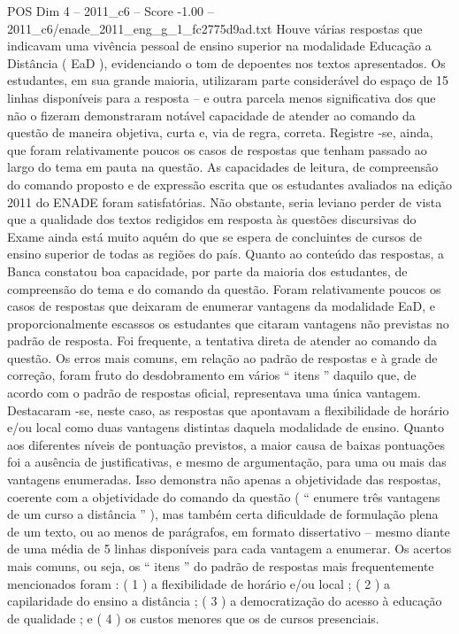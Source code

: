 \begin{textsample}{POS Dim 4 – 2011\_c6 – Score -1.00 – 2011\_c6/enade\_2011\_eng\_g\_1\_fc2775d9ad.txt}
Houve várias respostas que indicavam uma vivência pessoal de ensino superior na modalidade Educação a Distância ( EaD ), evidenciando o tom de depoentes nos textos apresentados.
Os estudantes, em sua grande maioria, utilizaram parte considerável do espaço de 15 linhas disponíveis para a resposta – e outra parcela menos significativa dos que não o fizeram demonstraram notável capacidade de atender ao comando da questão de maneira objetiva, curta e, via de regra, correta.
Registre -se, ainda, que foram relativamente poucos os casos de respostas que tenham passado ao largo do tema em pauta na questão.
As capacidades de leitura, de compreensão do comando proposto e de expressão escrita que os estudantes avaliados na edição 2011 do ENADE foram satisfatórias.
Não obstante, seria leviano perder de vista que a qualidade dos textos redigidos em resposta às questões discursivas do Exame ainda está muito aquém do que se espera de concluintes de cursos de ensino superior de todas as regiões do país.
Quanto ao conteúdo das respostas, a Banca constatou boa capacidade, por parte da maioria dos estudantes, de compreensão do tema e do comando da questão.
Foram relativamente poucos os casos de respostas que deixaram de enumerar vantagens da modalidade EaD, e proporcionalmente escassos os estudantes que citaram vantagens não previstas no padrão de resposta.
Foi frequente, a tentativa direta de atender ao comando da questão.
Os erros mais comuns, em relação ao padrão de respostas e à grade de correção, foram fruto do desdobramento em vários “ itens ” daquilo que, de acordo com o padrão de respostas oficial, representava uma única vantagem.
Destacaram -se, neste caso, as respostas que apontavam a flexibilidade de horário e/ou local como duas vantagens distintas daquela modalidade de ensino.
Quanto aos diferentes níveis de pontuação previstos, a maior causa de baixas pontuações foi a ausência de justificativas, e mesmo de argumentação, para uma ou mais das vantagens enumeradas.
Isso demonstra não apenas a objetividade das respostas, coerente com a objetividade do comando da questão ( “ enumere três vantagens de um curso a distância ” ), mas também certa dificuldade de formulação plena de um texto, ou ao menos de parágrafos, em formato dissertativo – mesmo diante de uma média de 5 linhas disponíveis para cada vantagem a enumerar.
Os acertos mais comuns, ou seja, os “ itens ” do padrão de respostas mais frequentemente mencionados foram : ( 1 ) a flexibilidade de horário e/ou local ; ( 2 ) a capilaridade do ensino a distância ; ( 3 ) a democratização do acesso à educação de qualidade ; e ( 4 ) os custos menores que os de cursos presenciais.

\end{textsample}
